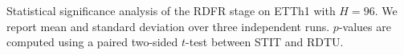 \documentclass[10pt]{article}
\begin{document}
\clearpage\begingroup

\setcounter{table}{8}

\begin{minipage}{5.5in}

\setlength{\textwidth}{\linewidth}

\captionsetup{type=table}

\centering
\caption{Statistical significance analysis of the RDFR stage on ETTh1 with $H=96$. We report mean and standard deviation over three independent runs. $p$-values are computed using a paired two-sided $t$-test between STIT and RDTU.}
\label{tab:significance_rdfr}
\centering
{}

\end{minipage}\par\endgroup

\clearpage\begingroup

\setcounter{table}{9}
\end{document}
